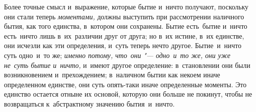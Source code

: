 Более точные смысл и~выражение, которые бытие и~ничто получают, поскольку они
стали теперь {\em моментами,} должны выступить при рассмотрении наличного
бытия, как того единства, в~котором они сохранены. Бытие есть~бытие и~ничто
есть~ничто лишь в~их~различии друг от друга; но в~их истине, в~их единстве, они
исчезли как эти определения, и~суть теперь нечто другое. Бытие~и~ничто суть
одно~и~то же; {\em именно потому, что~они "--- одно~и~то же, они уже не~суть
бытие и~ничто,} и~имеют другое определение: в~становлении они были
возникновением и~прехождением; в~наличном бытии как некоем иначе определенном
единстве, они суть опять-таки иначе определенные моменты. Это единство остается
отныне их основой, которую они больше не покинут, чтобы не возвращаться
к~абстрактному значению бытия~и~ничто.

\bigskip
